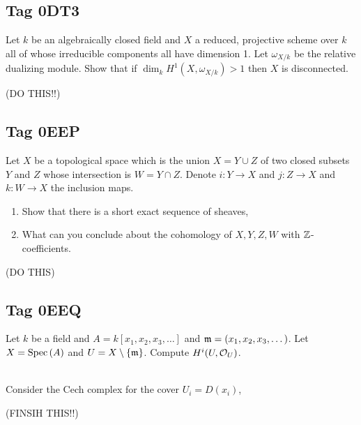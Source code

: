 \documentclass[12pt]{article}
\begin{document}
\subsection{Tag 0DT3}

\begin{exr}
Let $k$ be an algebraically closed field and $X$ a reduced, projective scheme over $k$ all of whose irreducible components all have dimension 1. Let $\omega_{X/k}$ be the relative dualizing module. Show that if $\dim_k H^1(X, \omega_{X/k}) > 1$ then $X$ is disconnected.
\end{exr}

(DO THIS!!)

\subsection{Tag 0EEP}

\begin{exr}
Let $X$ be a topological space which is the union $X = Y \cup Z$ of two closed subsets $Y$ and $Z$ whose intersection is $W = Y \cap Z$. Denote $i : Y \to X$ and $j : Z \to X$ and $k : W \to X$ the inclusion maps. 
\begin{enumerate}
\item Show that there is a short exact sequence of sheaves,
\begin{center}
\end{center}
\item What can you conclude about the cohomology of $X, Y, Z, W$ with $\mathbb{Z}$-coefficients. 
\end{enumerate}
\end{exr}

(DO THIS)

\subsection{Tag 0EEQ}

\begin{exr}
Let $k$ be a field and $A = k[x_1, x_2, x_3, \dots]$ and $\mathfrak{m} = (x_1, x_2, x_3, \dots)$. Let $X = \mathrm{Spec}\left( A \right)$ and $U = X \setminus \{ \mathfrak{m} \}$. Compute $H^i(U, \mathcal{O}_{U})$.
\end{exr}
\noindent\\
Consider the Cech complex for the cover $U_i = D(x_i)$,
\begin{center}
\end{center}
(FINSIH THIS!!)
\end{document}
